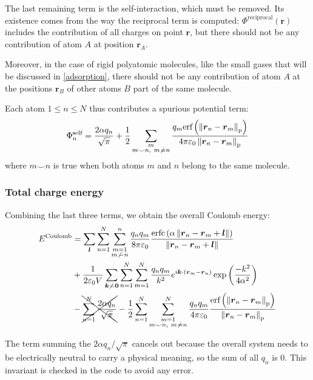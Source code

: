 \documentclass[main.tex]{subfiles}
\begin{document}
The last remaining term is the self-interaction, which must be removed. Its existence comes from the way the reciprocal term is computed: $\Phi^\text{reciprocal}(\boldsymbol r)$ includes the contribution of all charges on point $\boldsymbol r$, but there should not be any contribution of atom $A$ at position $\boldsymbol r_A$.

Moreover, in the case of rigid polyatomic molecules, like the small gases that will be discussed in \cref{adsorption}, there should not be any contribution of atom $A$ at the positions $\boldsymbol r_B$ of other atoms $B$ part of the same molecule.

Each atom $1\le n\le N$ thus contributes a spurious potential term:
\[\Phi^\text{self}_n = \frac{2\alpha q_n}{\sqrt\pi} + \frac12\sum_{\substack{m\\m\smile n,\ m\not\kern0.2ex= n}}\frac{q_m\text{erf}\left(\left\|\boldsymbol r_n - \boldsymbol r_m\right\|_\text{p}\right)}{4\pi\varepsilon_0\left\|\boldsymbol r_n - \boldsymbol r_m\right\|_\text{p}}\]
where $m\smile n$ is true when both atoms $m$ and $n$ belong to the same molecule.

\subsubsection{Total charge energy}

Combining the last three terms, we obtain the overall Coulomb energy:
\[\begin{split}
E^\text{Coulomb} &= \sum_{\boldsymbol l} \sum_{n=1}^N\sum_{\substack{m=1\\m\not\smile n}}^n \frac{q_n q_m}{8\pi\varepsilon_0}\frac{\text{erfc}\left(\alpha\left\|\boldsymbol r_n - \boldsymbol r_m + \boldsymbol l\right\|\right)}{\left\|\boldsymbol r_n - \boldsymbol r_m + \boldsymbol l\right\|}
\\&+ \frac1{2\varepsilon_0V} \sum_{\boldsymbol{k}\not\kern0.2ex=\boldsymbol{0}}\sum_{n=1}^N\sum_{m=1}^N \frac{q_n q_m}{k^2}e^{i\boldsymbol k\cdot\left(\boldsymbol r_m - \boldsymbol r_n\right)}\exp\left(\frac{-k^2}{4\alpha^2}\right)
\\&- \xcancel{\sum_{n=1}^N\frac{2\alpha q_n}{\sqrt\pi}}
- \frac12\sum_{n=1}^N\sum_{\substack{m=1\\m\smile n,\ m\not\kern0.2ex= n}}^N \frac{q_n q_m}{4\pi\varepsilon_0}\frac{\text{erf}\left(\left\|\boldsymbol r_n - \boldsymbol r_m\right\|_\text{p}\right)}{\left\|\boldsymbol r_n - \boldsymbol r_m\right\|_\text{p}}
\label{eq:totalcoulombenergy}\end{split}\]

The term summing the $2\alpha q_n/\sqrt\pi$ cancels out because the overall system needs to be electrically neutral to carry a physical meaning, so the sum of all $q_n$ is 0. This invariant is checked in the code to avoid any error.
\end{document}
